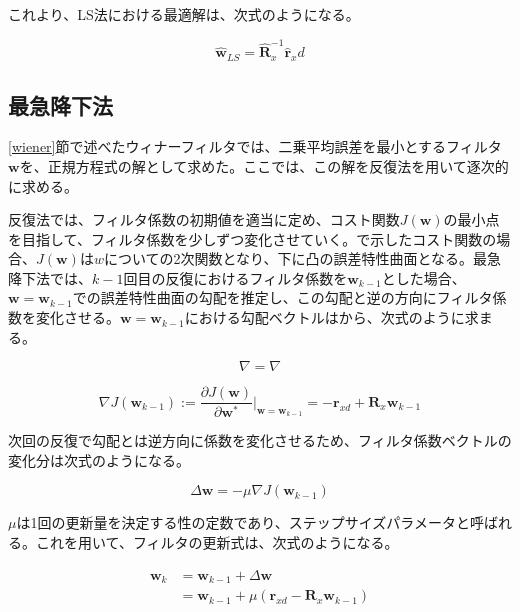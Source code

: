 これより、LS法における最適解は、次式のようになる。

\begin{equation}
\hat{\bm{w}}_{LS} = \hat{\bm{R}}_x^{-1} \hat{\bm{r}}_xd
\end{equation}

\subsection{最急降下法}\label{sd}

\ref{wiener}節で述べたウィナーフィルタでは、二乗平均誤差を最小とするフィルタ\(\bm{w}\)を、正規方程式の解として求めた。ここでは、この解を反復法を用いて逐次的に求める。

反復法では、フィルタ係数の初期値を適当に定め、コスト関数\(J(\bm{w})\)の最小点を目指して、フィルタ係数を少しずつ変化させていく。で示したコスト関数の場合、\(J(\bm{w})\)は\(w\)についての2次関数となり、下に凸の誤差特性曲面となる。最急降下法では、\(k-1\)回目の反復におけるフィルタ係数を\(\bm{w}_{k-1}\)とした場合、\(\bm{w} = \bm{w}_{k-1}\)での誤差特性曲面の勾配を推定し、この勾配と逆の方向にフィルタ係数を変化させる。\(\bm{w} = \bm{w}_{k-1}\)における勾配ベクトルはから、次式のように求まる。

\begin{equation}
  \nabla=\nabla
\end{equation}

\begin{equation}
\nabla J(\bm{w}_{k-1}) := \frac{\partial J(\bm{w})}{\partial \bm{w}^*} |_{\bm{w} = \bm{w}_{k-1}} = - \bm{r}_{xd} + \bm{R}_x \bm{w}_{k-1}
\end{equation}

次回の反復で勾配とは逆方向に係数を変化させるため、フィルタ係数ベクトルの変化分は次式のようになる。

\begin{equation}
\Delta \bm{w} = - \mu \nabla J(\bm{w}_{k-1})
\end{equation}

\(\mu\)は1回の更新量を決定する性の定数であり、ステップサイズパラメータと呼ばれる。これを用いて、フィルタの更新式は、次式のようになる。

\begin{equation}
\begin{split}
\bm{w}_k &= \bm{w}_{k-1} + \Delta \bm{w} \\
         &= \bm{w}_{k-1} + \mu (\bm{r}_{xd} - \bm{R}_x \bm{w}_{k-1})
\end{split}
\label{equ:w_delta}
\end{equation}

